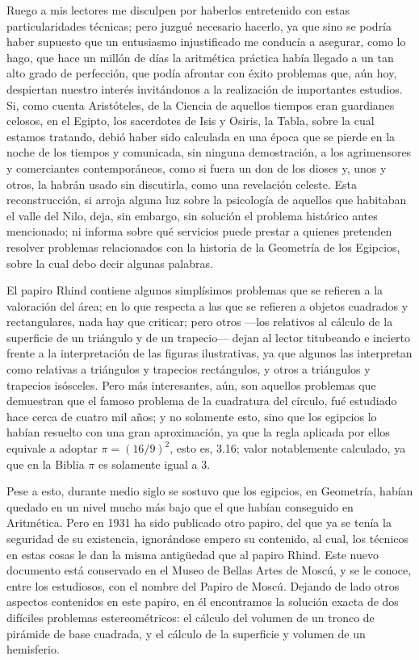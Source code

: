 \documentclass[a4paper, 12pt, draft]{article}
\begin{document}





Ruego a mis lectores me disculpen por haberlos entretenido con estas particularidades técnicas; pero juzgué necesario hacerlo, ya que sino se podría haber supuesto que un entusiasmo injustificado me conducía a asegurar, como lo hago, que hace un millón de días la aritmética práctica había llegado a un tan alto grado de perfección, que podía afrontar con éxito problemas que, aún hoy, despiertan nuestro interés invitándonos a la realización de importantes estudios. Si, como cuenta Aristóteles, de la Ciencia de aquellos tiempos eran guardianes celosos, en el Egipto, los sacerdotes de Isis y Osiris, la Tabla, sobre la cual estamos tratando, debió haber sido calculada en una época que se pierde en la noche de los tiempos y comunicada, sin ninguna demostración, a los agrimensores y comerciantes contemporáneos, como si fuera un don de los dioses y, unos y otros, la habrán usado sin discutirla, como una revelación celeste. Esta reconstrucción, si arroja alguna luz sobre la psicología de aquellos que habitaban el valle del Nilo, deja, sin embargo, sin solución el problema histórico antes mencionado; ni informa sobre qué servicios puede prestar a quienes pretenden resolver problemas relacionados con la historia de la Geometría de los Egipcios, sobre la cual debo decir algunas palabras.

El papiro Rhind contiene algunos simplísimos problemas que se refieren a la valoración del	
área; en lo que respecta a las que se refieren a objetos cuadrados y rectangulares, nada hay que criticar;
pero otros ---los relativos al cálculo de la superficie de un triángulo y de un trapecio--- dejan al lector titubeando e incierto frente a la interpretación de las figuras ilustrativas, ya que algunos las interpretan como relativas a triángulos y trapecios rectángulos, y otros a triángulos y trapecios isósceles. Pero más interesantes, aún, son aquellos problemas que demuestran que el famoso problema de la cuadratura del círculo, fué estudiado hace cerca de cuatro mil años; y no solamente esto, sino que los egipcios lo habían resuelto con una gran aproximación, ya que la regla aplicada por ellos equivale a adoptar $\pi=(16/9)^2$, esto es, 3.16; valor notablemente calculado, ya que en la Biblia $\pi$ es solamente igual a 3.

Pese a esto, durante medio siglo se sostuvo que los egipcios, en Geometría, habían quedado en un nivel mucho más bajo que el que habían conseguido en Aritmética. Pero en 1931 ha sido publicado otro papiro, del que ya se tenía la seguridad de su  existencia, ignorándose empero su contenido, al cual, los técnicos en estas cosas le dan la misma antigüedad que al papiro Rhind. Este nuevo documento está conservado en el Museo de Bellas Artes de Moscú, y se le conoce, entre los estudiosos, con el nombre del Papiro de Moscú. Dejando de lado otros aspectos contenidos en este papiro, en él encontramos la solución exacta de dos difíciles problemas estereométricos: el cálculo del volumen de
un tronco de pirámide de base cuadrada, y el cálculo de la superficie y volumen de un hemisferio.
\end{document}
